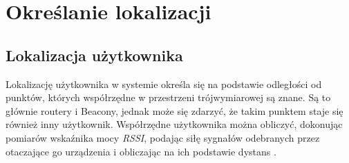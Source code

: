 \chapter{Określanie lokalizacji}
\label{cha:lokalizacja}
\section{Lokalizacja użytkownika}
Lokalizację użytkownika w systemie określa się na podstawie odległości od punktów, których współrzędne w przestrzeni trójwymiarowej są znane. Są to głównie routery i Beacony, jednak może się zdarzyć, że takim punktem staje się również inny użytkownik. Współrzędne użytkownika można obliczyć, dokonując pomiarów wskaźnika mocy \textit{RSSI}, podając siłę sygnałów odebranych przez otaczające go urządzenia i obliczając na ich podstawie dystans \cite{RSC}.
